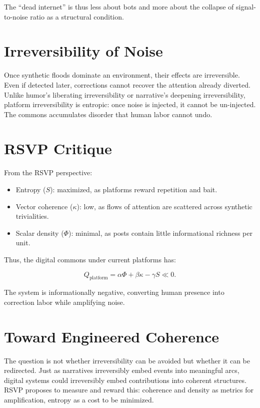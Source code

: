 \documentclass[openany]{book}
\begin{document}
The ``dead internet'' is thus less about bots and more about the collapse of signal-to-noise ratio as a structural condition.

\section{Irreversibility of Noise}

Once synthetic floods dominate an environment, their effects are irreversible. Even if detected later, corrections cannot recover the attention already diverted. Unlike humor’s liberating irreversibility or narrative’s deepening irreversibility, platform irreversibility is entropic: once noise is injected, it cannot be un-injected. The commons accumulates disorder that human labor cannot undo.

\section{RSVP Critique}

From the RSVP perspective:

\begin{itemize}
    \item Entropy ($S$): maximized, as platforms reward repetition and bait.
    \item Vector coherence ($\kappa$): low, as flows of attention are scattered across synthetic trivialities.
    \item Scalar density ($\Phi$): minimal, as posts contain little informational richness per unit.
\end{itemize}

Thus, the digital commons under current platforms has:

\[ Q_{\text{platform}} = \alpha \Phi + \beta \kappa - \gamma S \ll 0. \]

The system is informationally negative, converting human presence into correction labor while amplifying noise.

\section{Toward Engineered Coherence}

The question is not whether irreversibility can be avoided but whether it can be redirected. Just as narratives irreversibly embed events into meaningful arcs, digital systems could irreversibly embed contributions into coherent structures. RSVP proposes to measure and reward this: coherence and density as metrics for amplification, entropy as a cost to be minimized.
\end{document}
